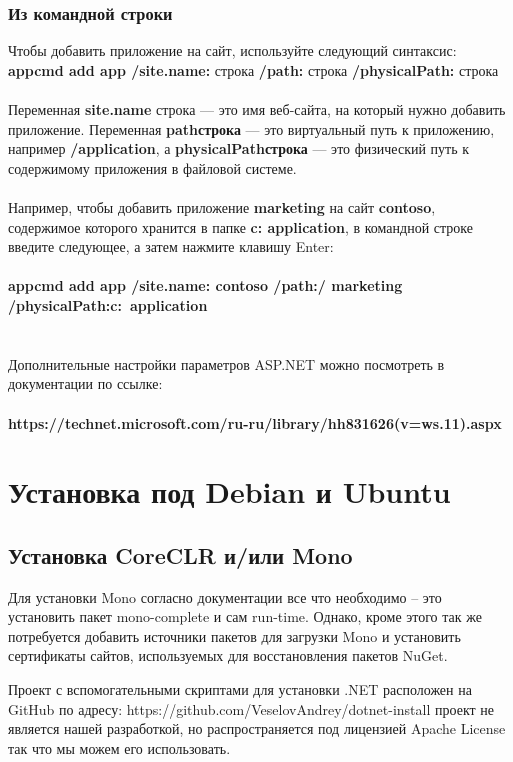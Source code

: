 \documentclass[12pt,a4paper,titlepage]{article}
\begin{document}
\subsubsection{Из командной строки}
Чтобы добавить приложение на сайт, используйте следующий синтаксис:\\
\textbf{appcmd add app /site.name:} строка \textbf{/path:} строка \textbf{/physicalPath:} строка
\\\\
Переменная \textbf{site.name} строка — это имя веб-сайта, на который нужно добавить приложение. Переменная \textbf{pathстрока} — это виртуальный путь к приложению, например \textbf{/application}, а \textbf{physicalPathстрока} — это физический путь к содержимому приложения в файловой системе.
\\\\
Например, чтобы добавить приложение \textbf{marketing} на сайт \textbf{contoso}, содержимое которого хранится в папке \textbf{c: application}, в командной строке введите следующее, а затем нажмите клавишу Enter:\\\\
\textbf{appcmd add app /site.name: contoso /path:/ marketing /physicalPath:c:\ application}
\\\\\\
Дополнительные настройки параметров ASP.NET можно посмотреть в документации по ссылке:\\\\
\textbf{https://technet.microsoft.com/ru-ru/library/hh831626(v=ws.11).aspx}
\section{Установка под Debian и Ubuntu}
\subsection{Установка CoreCLR и/или Mono}
Для установки Mono согласно документации все что необходимо – это установить пакет mono-complete и сам run-time. Однако, кроме этого так же потребуется добавить источники пакетов для загрузки Mono и установить сертификаты сайтов, используемых для восстановления пакетов NuGet.

Проект с вспомогательными скриптами для установки .NET расположен на GitHub по адресу: https://github.com/VeselovAndrey/dotnet-install проект не является нашей разработкой, но распространяется под лицензией Apache License так что мы можем его использовать.
\end{document}
